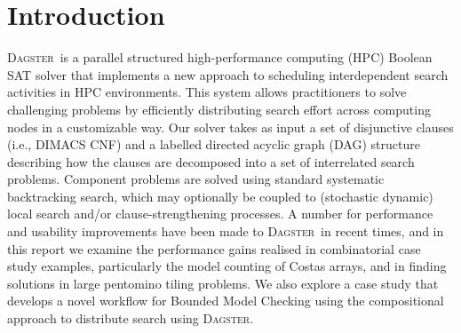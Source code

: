 \documentclass[10pt,a4paper,oneside,headinclude,footinclude,BCOR5mm]{scrartcl}
\newcommand{\dagster}{\textsc{Dagster}\xspace}
\begin{document}

\newpage %

\setcounter{tocdepth}{2} %
\tableofcontents %
\listoffigures %
\listoftables %

\newpage %






\section{Introduction}

\dagster\ is a parallel structured high-performance computing (HPC) Boolean SAT solver that implements a new approach to scheduling interdependent search activities in HPC environments.
This system allows practitioners to solve challenging problems by efficiently distributing search effort across computing nodes in a customizable way.
Our solver takes as input a set of disjunctive clauses (i.e., DIMACS CNF) and a labelled directed acyclic graph (DAG) structure describing how the clauses are decomposed into a set of interrelated search problems.
Component problems are solved using standard systematic backtracking search, which may optionally be coupled to (stochastic dynamic) local search and/or clause-strengthening processes.
A number for performance and usability improvements have been made to \dagster\ in recent times, and in this report we examine the performance gains realised in combinatorial case study examples, particularly the model counting of Costas arrays, and in finding solutions in large pentomino tiling problems.
We also explore a case study that develops a novel workflow for Bounded Model Checking using the compositional approach to distribute search using \dagster.
\end{document}
